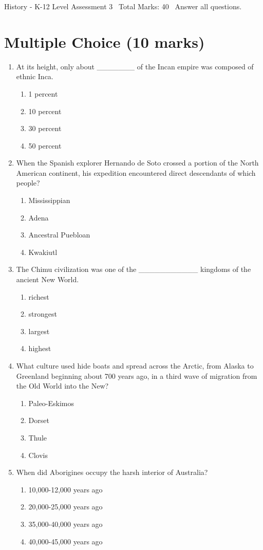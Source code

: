 \documentclass[12pt]{article}
\begin{document}
\begin{center}
History - K-12 Level Assessment 3 \
Total Marks: 40 \
Answer all questions.
\end{center}

\section*{Multiple Choice (10 marks)}
\begin{enumerate}[label=\arabic*.]
\item At its height, only about \_\_\_\_\_\_\_ of the Incan empire was composed of ethnic Inca.
\begin{enumerate}[label=(\alph*)]
    \item 1 percent
    \item 10 percent
    \item 30 percent
    \item 50 percent
\end{enumerate}
\item When the Spanish explorer Hernando de Soto crossed a portion of the North American continent, his expedition encountered direct descendants of which people?
\begin{enumerate}[label=(\alph*)]
    \item Mississippian
    \item Adena
    \item Ancestral Puebloan
    \item Kwakiutl
\end{enumerate}
\item The Chimu civilization was one of the \_\_\_\_\_\_\_\_\_\_\_ kingdoms of the ancient New World.
\begin{enumerate}[label=(\alph*)]
    \item richest
    \item strongest
    \item largest
    \item highest
\end{enumerate}
\item What culture used hide boats and spread across the Arctic, from Alaska to Greenland beginning about 700 years ago, in a third wave of migration from the Old World into the New?
\begin{enumerate}[label=(\alph*)]
    \item Paleo-Eskimos
    \item Dorset
    \item Thule
    \item Clovis
\end{enumerate}
\item When did Aborigines occupy the harsh interior of Australia?
\begin{enumerate}[label=(\alph*)]
    \item 10,000-12,000 years ago
    \item 20,000-25,000 years ago
    \item 35,000-40,000 years ago
    \item 40,000-45,000 years ago
\end{enumerate}
\end{enumerate}
\end{document}
